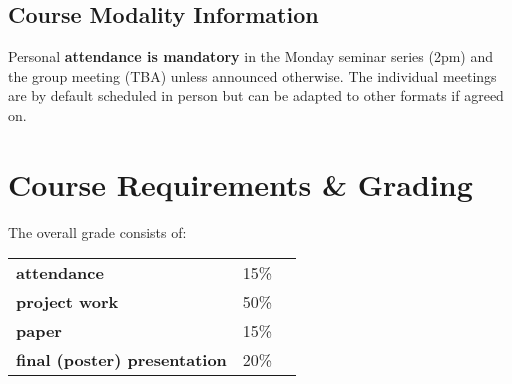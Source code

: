 \documentclass[letterpaper,oneside,10pt]{scrartcl}
\begin{document}
    \subsection{Course Modality Information}
        Personal \textbf{attendance is mandatory} in  the Monday seminar series (2pm) and the group meeting (TBA) unless announced otherwise. The individual meetings are by default scheduled in person but can be adapted to other formats if agreed on.
        
\section{Course Requirements \& Grading}
    The overall grade consists of:
    \smallskip
    
    \begin{tabular}{lll}
        \textbf{attendance} & 15\%\\
        \textbf{project work} & 50\%\\
        \textbf{paper} & 15\%\\
        \textbf{final (poster) presentation} & 20\% \\
    \end{tabular}
    
\end{document}

